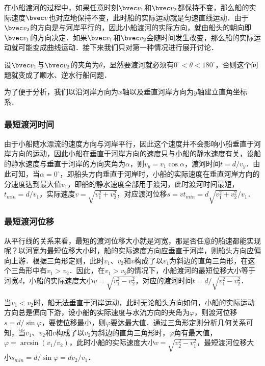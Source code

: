 在小船渡河的过程中，如果任意时刻$\bvec v_1$和$\bvec v_2$都保持不变，那么船的实际速度$\bvec v$也对应地保持不变，此时船的实际运动就是匀速直线运动．由于$\bvec v_2$的方向是与河岸平行的，因此小船渡河的实际方向，就由船头的朝向即$\bvec v_1$的方向决定．如果$\bvec v_1$和$\bvec v_2$会随时间发生改变，那么船的实际运动就可能变成曲线运动．接下来我们只对第一种情况进行展开讨论．

设$\bvec v_1$与$\bvec v_2$的夹角为$\theta$，显然要渡河就必须有$0^\circ < \theta < 180^\circ $，否则这个问题就变成了顺水、逆水行船问题．

为了便于分析，我们以沿河岸方向为$x$轴以及垂直河岸方向为$y$轴建立直角坐标系．

\subsubsection{最短渡河时间}

由于小船随水漂流的速度方向与河岸平行，因此这个速度并不会影响小船垂直于河岸方向的运动，因此小船在垂直于河岸方向的速度只与小船的静水速度有关，设船的静水速度与垂直于河岸的方向夹角为$\alpha$，则$v_y = v_1 \cos \alpha$，渡河时间$t=d/v_y$．由此可知，当$\alpha = 0^\circ$，即船头方向垂直于河岸时，小船的实际速度在垂直河岸方向的分速度达到最大值$v_1$，即船的静水速度全部用于渡河，此时渡河时间最短，$t_{min}=d/v_1$，实际速度$v=\sqrt{v_1^2+v_2^2}$，对应渡河位移$s=vt_{min}=d\sqrt{v_1^2+v_2^2}/v_1$．

\subsubsection{最短渡河位移}

从平行线的关系来看，最短的渡河位移大小就是河宽，那是否任意的船速都能实现呢？以河宽为最短位移大小时，船的实际速度方向应垂直于河岸，则船头方向应偏向上游．根据三角形定则，此时$v_1$、$v_2$和$v$构成了以$v_1$为斜边的直角三角形，在这个三角形中有$v_1>v_2$．因此，在$v_1>v_2$的情况下，小船渡河的最短位移大小等于河宽$d$，小船的实际速度大小$v=\sqrt{v_1^2-v_2^2}$，对应的渡河时间$t=d/\sqrt{v_1^2-v_2^2}$．

当$v_1<v_2$时，船无法垂直于河岸运动，此时无论船头方向如何，小船的实际运动方向总是偏向下游，设小船的实际速度与水流方向的夹角为$\varphi$，则渡河位移$s = d/\sin \varphi$，要使位移最小，则$\varphi$要达最大值．通过三角形定则分析几何关系可知，当$v_1$、$v_2$和$v$构成了以$v_2$为斜边的直角三角形时，$\varphi$角有最大值，$\varphi=\arcsin(v_1/v_2)$，此时小船的实际速度大小$v=\sqrt{v_2^2-v_1^2}$，最短渡河位移大小$s_{min} = d/\sin \varphi=dv_2/v_1$．

